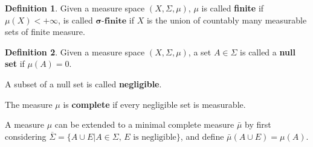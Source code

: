 \documentclass[openany]{book}
\theoremstyle{definition}
\newtheorem{definition}{Definition}[chapter]
\theoremstyle{remark}
\begin{document}
\begin{definition}
    Given a measure space $(X,\Sigma,\mu)$, $\mu$ is called \textbf{finite} if $\mu(X)<+\infty$, is called $\boldsymbol{\sigma}\textbf{-finite}$ if $X$ is the union of countably many measurable sets of finite measure.
\end{definition}

\begin{definition}
    Given a measure space $(X,\Sigma,\mu)$, a set $A\in\Sigma$ is called a \textbf{null set} if $\mu(A)=0$.

    A subset of a null set is called \textbf{negligible}.

    The measure $\mu$ is \textbf{complete} if every negligible set is measurable.
\end{definition}
A measure $\mu$ can be extended to a minimal complete measure $\bar{\mu}$ by first considering $\overline{\Sigma}=\{A\cup E|A\in\Sigma,\,E\textrm{ is negligible}\}$, and define $\bar{\mu}(A\cup E)=\mu(A)$.

\begin{comment}
\begin{definition}
    Given a measure space $(X,\Sigma,\mu)$, a subset $B\subset X$ is called \textbf{locally measurable} if $B\cap A\in\Sigma$ for all $A\in\Sigma$ with finite measure. Let $\widetilde{\Sigma}$ be the collection of locally measurable subsets. We have $\Sigma\subset\widetilde{\Sigma}$, and if $\Sigma=\widetilde{\Sigma}$, $\mu$ is called \textbf{saturated}.
\end{definition}
If $\mu$ is $\sigma$-finite, then $\mu$ is saturated. $\widetilde{\Sigma}$ is also a $\sigma$-algebra. Furthermore, we can define $\tilde{\mu}$ on $\widetilde{\Sigma}$, that $\tilde{\mu}(A)=\mu(A)$ if $A\in\Sigma$, and $\tilde{\mu}(A)=+\infty$ otherwise. Then $\tilde{\mu}$ is a saturated measure on $\widetilde{\Sigma}$, called the \textbf{saturation} of $\mu$. If $\mu$ is complete, then so is $\tilde{\mu}$.
\end{comment}
\end{document}
